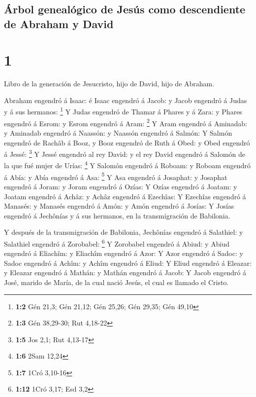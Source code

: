 \hypertarget{uxe1rbol-genealuxf3gico-de-jesuxfas-como-descendiente-de-abraham-y-david}{%
\subsection{Árbol genealógico de Jesús como descendiente de Abraham y
David}\label{uxe1rbol-genealuxf3gico-de-jesuxfas-como-descendiente-de-abraham-y-david}}

\hypertarget{section}{%
\section{1}\label{section}}

 Libro de la generación de Jesucristo, hijo de David, hijo
de Abraham.

 Abraham engendró á Isaac: é Isaac engendró á Jacob: y
Jacob engendró á Judas y á sus hermanos: \footnote{\textbf{1:2} Gén
  21,3; Gén 21,12; Gén 25,26; Gén 29,35; Gén 49,10}  Y
Judas engendró de Thamar á Phares y á Zara: y Phares engendró á Esrom: y
Esrom engendró á Aram: \footnote{\textbf{1:3} Gén 38,29-30; Rut 4,18-22}
 Y Aram engendró á Aminadab: y Aminadab engendró á
Naassón: y Naassón engendró á Salmón:  Y Salmón engendró
de Rachâb á Booz, y Booz engendró de Ruth á Obed: y Obed engendró á
Jessé: \footnote{\textbf{1:5} Jos 2,1; Rut 4,13-17}  Y
Jessé engendró al rey David: y el rey David engendró á Salomón de la que
fué mujer de Urías: \footnote{\textbf{1:6} 2Sam 12,24}  Y
Salomón engendró á Roboam: y Roboam engendró á Abía: y Abía engendró á
Asa: \footnote{\textbf{1:7} 1Cró 3,10-16}  Y Asa engendró
á Josaphat: y Josaphat engendró á Joram: y Joram engendró á Ozías:
 Y Ozías engendró á Joatam: y Joatam engendró á Achâz: y
Achâz engendró á Ezechîas:  Y Ezechîas engendró á
Manasés: y Manasés engendró á Amón: y Amón engendró á Josías:
 Y Josías engendró á Jechônías y á sus hermanos, en la
transmigración de Babilonia.

 Y después de la transmigración de Babilonia, Jechônías
engendró á Salathiel: y Salathiel engendró á Zorobabel: \footnote{\textbf{1:12}
  1Cró 3,17; Esd 3,2}  Y Zorobabel engendró á Abiud: y
Abiud engendró á Eliachîm: y Eliachîm engendró á Azor:  Y
Azor engendró á Sadoc: y Sadoc engendró á Achîm: y Achîm engendró á
Eliud:  Y Eliud engendró á Eleazar: y Eleazar engendró á
Mathán: y Mathán engendró á Jacob:  Y Jacob engendró á
José, marido de María, de la cual nació Jesús, el cual es llamado el
Cristo.

